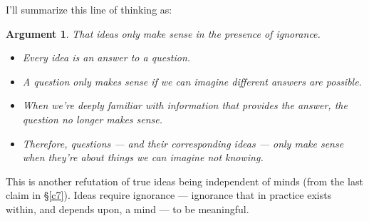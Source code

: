 \documentclass[9pt, twoside]{book}
\theoremstyle{argtstyle}
\newtheorem*{argt}{Argument}
\begin{document}
I'll summarize this line of thinking as:
\begin{argt} That ideas only make sense in the presence of ignorance.
    \label{a3}
    \normalfont
    \begin{itemize}
        \item Every idea is an answer to a question.
        \item A question only makes sense if we can imagine different
            answers are possible.
        \item When we're deeply familiar with information that
            provides the answer, the question no longer makes sense.
        \item Therefore, questions --- and their corresponding ideas --- only
            make sense when they're about things we can imagine not knowing.
    \end{itemize}
\end{argt}
This is another refutation of true ideas being independent of minds (from
the last claim in \S\ref{c7}).
Ideas require ignorance --- ignorance that in practice
exists within, and depends upon, a mind ---
to be meaningful.

\end{document}
